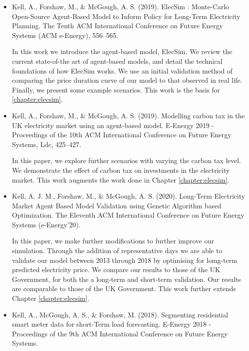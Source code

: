 \begin{itemize}
	
	\item \cite{Kell} Kell, A., Forshaw, M., \& McGough, A. S. (2019). ElecSim : Monte-Carlo Open-Source Agent-Based Model to Inform Policy for Long-Term Electricity Planning. The Tenth ACM International Conference on Future Energy Systems (ACM e-Energy), 556–565.
	
	In this work we introduce the agent-based model, ElecSim. We review the current state-of-the art of agent-based models, and detail the technical foundations of how ElecSim works. We use an initial validation method of comparing the price duration curve of our model to that observed in real life. Finally, we present some example scenarios. This work is the basis for \ref{chapter:elecsim}.
	
	\item \cite{Kell2019a} Kell, A., Forshaw, M., \& McGough, A. S. (2019). Modelling carbon tax in the UK electricity market using an agent-based model. E-Energy 2019 - Proceedings of the 10th ACM International Conference on Future Energy Systems, Ldc, 425–427. 
	
	In this paper, we explore further scenarios with varying the carbon tax level. We demonstrate the effect of carbon tax on investments in the electricity market. This work augments the work done in Chapter \ref{chapter:elecsim}.
	
	
	\item \cite{Kell2020b} Kell, A. J. M., Forshaw, M., \& McGough, A. S. (2020). Long-Term Electricity Market Agent Based Model Validation using Genetic Algorithm based Optimization. The Eleventh ACM International Conference on Future Energy Systems (e-Energy’20).
		
	In this paper, we make further modifications to further improve our simulation. Through the addition of representative days we are able to validate our model between 2013 through 2018 by optimising for lomg-term predicted electricity price. We compare our results to those of the UK Government, for both the a long-term and short-term validation. Our results are comparable to those of the UK Government. This work further extends Chapter \ref{chapter:elecsim}.
	
	\item \cite{Kell2018a} Kell, A., McGough, A. S., \& Forshaw, M. (2018). Segmenting residential smart meter data for short-Term load forecasting. E-Energy 2018 - Proceedings of the 9th ACM International Conference on Future Energy Systems.
	

\end{itemize}
